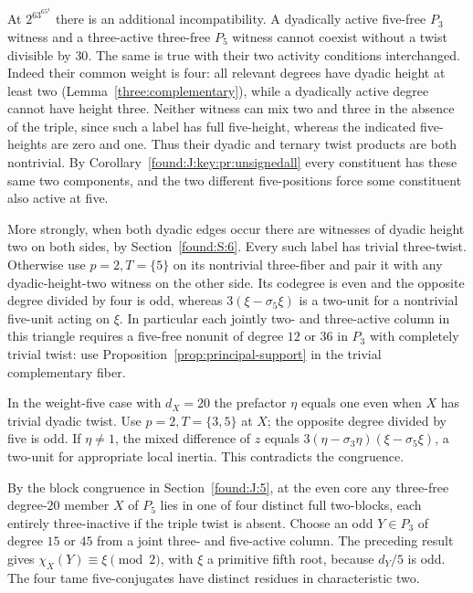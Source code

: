\documentclass[11pt,a4paper]{article}
\numberwithin{equation}{section}
\theoremstyle{remark}
\begin{document}
At $2^63^65^4$ there is an additional incompatibility. A dyadically
active five-free $P_3$ witness and a three-active three-free $P_5$
witness cannot coexist without a twist divisible by $30$. The same
is true with their two activity conditions interchanged. Indeed their
common weight is four: all relevant degrees have dyadic height at
least two (Lemma~\ref{three:complementary}), while a dyadically active degree cannot
have height three. Neither witness can mix two and three in the
absence of the triple, since such a label has full five-height,
whereas the indicated five-heights are zero and one. Thus their
dyadic and ternary twist products are both nontrivial. By
Corollary~\ref{found:J:key:pr:unsignedall} every constituent has these same two
components, and the two different five-positions force some
constituent also active at five.

More strongly, when both dyadic edges occur there are witnesses of
dyadic height two on both sides, by Section~\ref{found:S:6}. Every such label
has trivial three-twist. Otherwise use $p=2,T=\{5\}$ on its nontrivial
three-fiber and pair it with any dyadic-height-two witness on the other
side. Its codegree is even and the opposite degree divided by four is
odd, whereas $3(\xi-\sigma_5\xi)$ is a two-unit for a nontrivial
five-unit acting on $\xi$. In particular each jointly two- and
three-active column in this triangle requires a five-free nonunit
of degree $12$ or $36$ in $P_3$ with completely trivial twist:
use Proposition~\ref{prop:principal-support} in the trivial complementary fiber.

In the weight-five case with $d_X=20$ the prefactor $\eta$ equals one
even when $X$ has trivial dyadic twist. Use $p=2,T=\{3,5\}$ at
$X$; the opposite degree divided by five is odd. If $\eta\ne1$,
the mixed difference of $z$ equals
$3(\eta-\sigma_3\eta)(\xi-\sigma_5\xi)$, a two-unit for appropriate
local inertia. This contradicts the congruence.

By the block congruence in Section~\ref{found:J:5}, at the even core any three-free degree-$20$ member
$X$ of $P_5$ lies in one of four distinct full two-blocks, each
entirely three-inactive if the triple twist is absent.
Choose an odd $Y\in P_3$ of degree $15$ or $45$ from a joint
three- and five-active column. The preceding result gives
$\chi_X(Y)\equiv\xi\pmod{2}$, with $\xi$ a primitive fifth root,
because $d_Y/5$ is odd. The four tame five-conjugates have
distinct residues in characteristic two.
\end{document}
